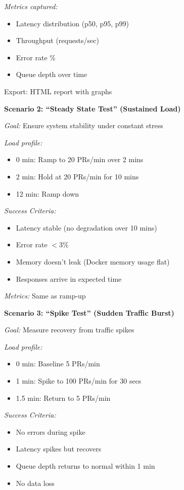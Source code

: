 \documentclass[11pt,a4paper]{article}
\begin{document}
\textit{Metrics captured:}
\begin{itemize}[leftmargin=*]
    \item Latency distribution (p50, p95, p99)
    \item Throughput (requests/sec)
    \item Error rate \%
    \item Queue depth over time
\end{itemize}

Export: HTML report with graphs

\textbf{Scenario 2: ``Steady State Test'' (Sustained Load)}

\textit{Goal:} Ensure system stability under constant stress

\textit{Load profile:}
\begin{itemize}[leftmargin=*]
    \item 0 min: Ramp to 20 PRs/min over 2 mins
    \item 2 min: Hold at 20 PRs/min for 10 mins
    \item 12 min: Ramp down
\end{itemize}

\textit{Success Criteria:}
\begin{itemize}[leftmargin=*]
    \item[$\checkmark$] Latency stable (no degradation over 10 mins)
    \item[$\checkmark$] Error rate $<$3\%
    \item[$\checkmark$] Memory doesn't leak (Docker memory usage flat)
    \item[$\checkmark$] Responses arrive in expected time
\end{itemize}

\textit{Metrics:} Same as ramp-up

\textbf{Scenario 3: ``Spike Test'' (Sudden Traffic Burst)}

\textit{Goal:} Measure recovery from traffic spikes

\textit{Load profile:}
\begin{itemize}[leftmargin=*]
    \item 0 min: Baseline 5 PRs/min
    \item 1 min: Spike to 100 PRs/min for 30 secs
    \item 1.5 min: Return to 5 PRs/min
\end{itemize}

\textit{Success Criteria:}
\begin{itemize}[leftmargin=*]
    \item[$\checkmark$] No errors during spike
    \item[$\checkmark$] Latency spikes but recovers
    \item[$\checkmark$] Queue depth returns to normal within 1 min
    \item[$\checkmark$] No data loss
\end{itemize}
\end{document}
